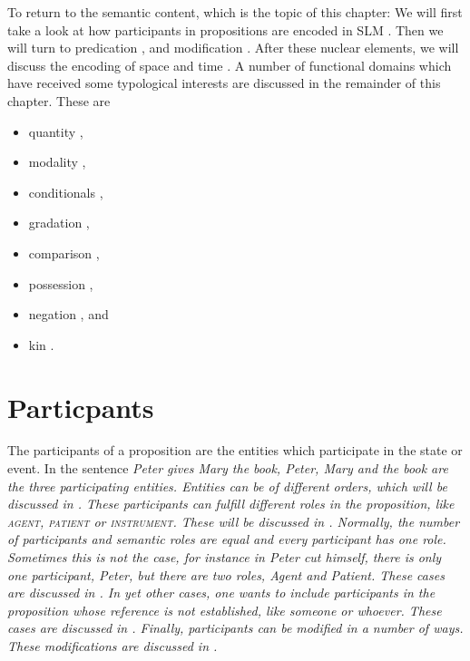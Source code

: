 To return to the semantic content, which is the topic of this chapter: We will first take a look at how participants in propositions are encoded in SLM
 .
Then we will turn to predication
,
and modification .
After these nuclear elements, we will discuss the encoding of space  and time . A number of functional domains which have received some typological interests are discussed in the remainder of this chapter. These are
\begin{itemize}
 \item quantity ,
 \item modality ,
 \item conditionals ,
 \item gradation ,
 \item comparison ,
 \item possession ,
 \item negation , and
 \item kin .
\end{itemize}



\section{Particpants}\label{sec:func:Particpants}
The participants of a proposition are the entities which participate in the state or event. In the sentence \em Peter gives Mary the book\em, \em Peter, Mary \em and \em the book \em are the three participating entities. Entities can be of different orders, which will be discussed in . These participants can fulfill different roles in the proposition, like \textsc{agent}, \textsc{patient} or \textsc{instrument}. These will be discussed in . Normally, the number of participants and semantic roles are equal and every participant has one role. Sometimes this is not the case, for instance in \em Peter cut himself\em, there is only one participant, \em Peter\em, but there are two roles, Agent and Patient. These cases are discussed in . In yet other cases, one wants to include participants in the proposition whose reference is not established, like \em someone \em or \em whoever\em. These cases are discussed in . Finally, participants can be modified in a number of ways. These modifications are discussed in .

